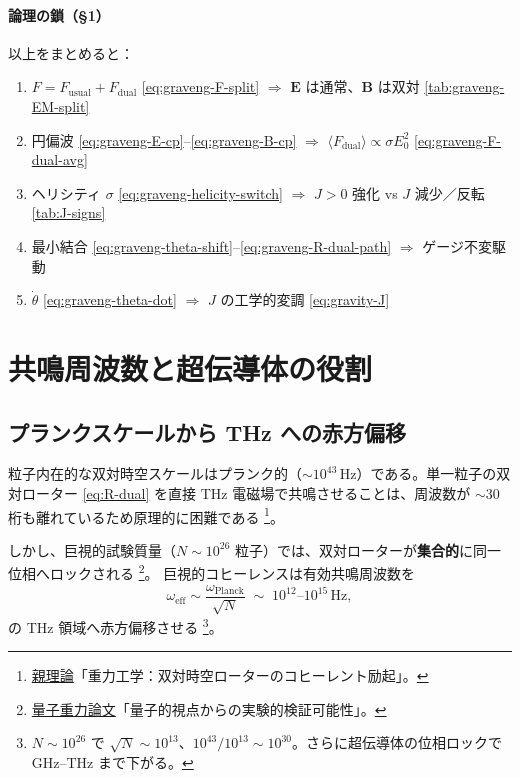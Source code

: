 \documentclass[dvipdfmx,a4paper,oneside]{jsbook}
\numberwithin{equation}{chapter}
\begin{document}
\paragraph{論理の鎖（§1）}
以上をまとめると：
\begin{enumerate}[leftmargin=2em]
  \item \(F = F_{\mathrm{usual}} + F_{\mathrm{dual}}\) \eqref{eq:graveng-F-split} \(\Rightarrow\) \(\mathbf{E}\) は通常、\(\mathbf{B}\) は双対 \eqref{tab:graveng-EM-split}
  \item 円偏波 \eqref{eq:graveng-E-cp}–\eqref{eq:graveng-B-cp} \(\Rightarrow\) \(\langle F_{\mathrm{dual}}\rangle \propto \sigma E_0^2\) \eqref{eq:graveng-F-dual-avg}
  \item ヘリシティ \(\sigma\) \eqref{eq:graveng-helicity-switch} \(\Rightarrow\) \(J > 0\) 強化 vs \(J\) 減少／反転 \eqref{tab:J-signs}
  \item 最小結合 \eqref{eq:graveng-theta-shift}–\eqref{eq:graveng-R-dual-path} \(\Rightarrow\) ゲージ不変駆動
  \item \(\dot{\theta}\) \eqref{eq:graveng-theta-dot} \(\Rightarrow\) \(J\) の工学的変調 \eqref{eq:gravity-J}
\end{enumerate}

\section{共鳴周波数と超伝導体の役割}

\subsection{プランクスケールから THz への赤方偏移}

粒子内在的な双対時空スケールはプランク的（\(\sim 10^{43}\,\mathrm{Hz}\)）である。単一粒子の双対ローター \eqref{eq:R-dual} を直接 THz 電磁場で共鳴させることは、周波数が \(\sim 30\) 桁も離れているため原理的に困難である \footnote{\hyperref[sec:sister-manuscripts]{親理論}「重力工学：双対時空ローターのコヒーレント励起」。}。

しかし、巨視的試験質量（\(N \sim 10^{26}\) 粒子）では、双対ローターが\textbf{集合的}に同一位相へロックされる \footnote{\hyperref[sec:sister-manuscripts]{量子重力論文}「量子的視点からの実験的検証可能性」。}。
巨視的コヒーレンスは有効共鳴周波数を
\begin{equation}
  \omega_{\mathrm{eff}} \sim \frac{\omega_{\mathrm{Planck}}}{\sqrt{N}}
  \;\sim\;
  10^{12}\text{--}10^{15}\,\mathrm{Hz},
  \label{eq:graveng-freq-redshift}
\end{equation}
の THz 領域へ赤方偏移させる \footnote{\(N \sim 10^{26}\) で \(\sqrt{N} \sim 10^{13}\)、\(10^{43}/10^{13} \sim 10^{30}\)。さらに超伝導体の位相ロックで GHz--THz まで下がる。}。
\end{document}
